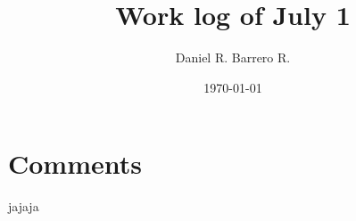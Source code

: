 \documentclass{amsart}
\title{Work log of July 1}
\author{Daniel R. Barrero R.}
\date{\today}
\begin{document}
\maketitle

\section{Comments}

jajaja
\end{document}
